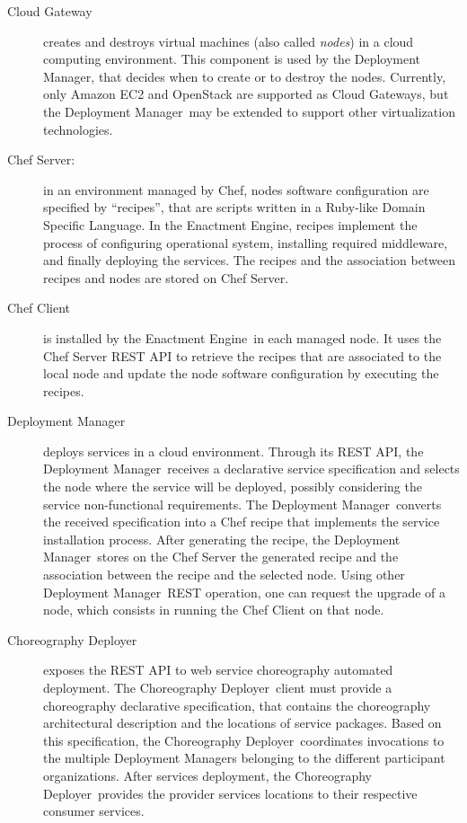 \documentclass[a4paper, 10pt]{article}
\newcommand{\ee}{Enactment Engine}
\newcommand{\cd}{Choreography Deployer}
\newcommand{\dm}{Deployment Manager}
\begin{document}
\begin{description}

\item [Cloud Gateway] creates and destroys virtual machines (also called \emph{nodes}) in a cloud computing environment. This component is used by the \dm, that decides when to create or to destroy the nodes. Currently, only Amazon EC2 and OpenStack are supported as Cloud Gateways, but the \dm\ may be extended to support other virtualization technologies.

\item [Chef Server:] in an environment managed by Chef, nodes software configuration are specified by ``recipes'', that are scripts written in a Ruby-like Domain Specific Language. In the \ee, recipes implement the process of configuring operational system, installing required middleware, and finally deploying the services. The recipes and the association between recipes and nodes are stored on Chef Server.

\item[Chef Client] is installed by the \ee\ in each managed node. It uses the Chef Server REST API to retrieve the recipes that are associated to the local node and update the node software configuration by executing the recipes. 

\item [\dm] deploys services in a cloud environment. Through its REST API, the \dm\ receives a declarative service specification and selects the node where the service will be deployed, possibly considering the service non-functional requirements. The \dm\ converts the received specification into a Chef recipe that implements the service installation process. After generating the recipe, the \dm\ stores on the Chef Server the generated recipe and the association between the recipe and the selected node. Using other \dm\ REST operation, one can request the upgrade of a node, which consists in running the Chef Client on that node.

\item [\cd] exposes the REST API to web service choreography automated deployment. The \cd\ client must provide a choreography declarative specification, that contains the choreography architectural description and the locations of service packages. Based on this specification, the \cd\ coordinates invocations to the multiple \dm{s} belonging to the different participant organizations. After services deployment, the \cd\ provides the provider services locations to their respective consumer services.

\end{description} 
\end{document}
